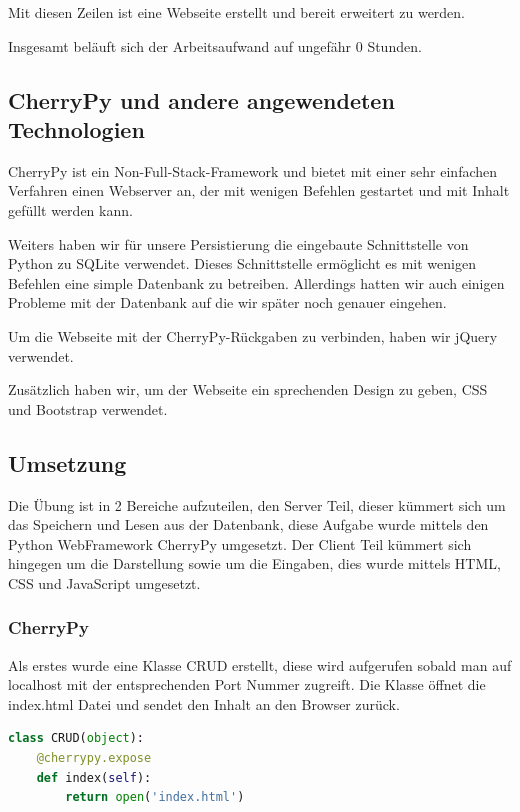 Mit diesen Zeilen ist eine Webseite erstellt und bereit erweitert zu werden.

Insgesamt beläuft sich der Arbeitsaufwand auf ungefähr 0 Stunden.

\subsection{CherryPy und andere angewendeten Technologien}

CherryPy ist ein Non-Full-Stack-Framework und bietet mit einer sehr einfachen Verfahren einen Webserver an, der mit wenigen Befehlen gestartet und mit Inhalt gefüllt werden kann.

Weiters haben wir für unsere Persistierung die eingebaute Schnittstelle von Python zu SQLite verwendet. Dieses Schnittstelle ermöglicht es mit wenigen Befehlen eine simple Datenbank zu betreiben. Allerdings hatten wir auch einigen Probleme mit der Datenbank auf die wir später noch genauer eingehen.

Um die Webseite mit der CherryPy-Rückgaben zu verbinden, haben wir jQuery verwendet. 

Zusätzlich haben wir, um der Webseite ein sprechenden Design zu geben, CSS und Bootstrap verwendet. 


\subsection{Umsetzung}


Die Übung ist in 2 Bereiche aufzuteilen, den Server Teil, dieser kümmert sich um das Speichern und Lesen aus der Datenbank, diese Aufgabe wurde mittels den Python WebFramework CherryPy umgesetzt. Der Client Teil kümmert sich hingegen um die Darstellung sowie um die Eingaben, dies wurde mittels HTML, CSS und JavaScript umgesetzt.

\subsubsection{CherryPy}

Als erstes wurde eine Klasse CRUD erstellt, diese wird aufgerufen sobald man auf localhost mit der entsprechenden Port Nummer zugreift. Die Klasse öffnet die index.html Datei und sendet den Inhalt an den Browser zurück.

\begin{lstlisting}[language=Python, caption=Klasse zur Darstellung der Index.html]
class CRUD(object):
	@cherrypy.expose
	def index(self):
		return open('index.html')
\end{lstlisting}

